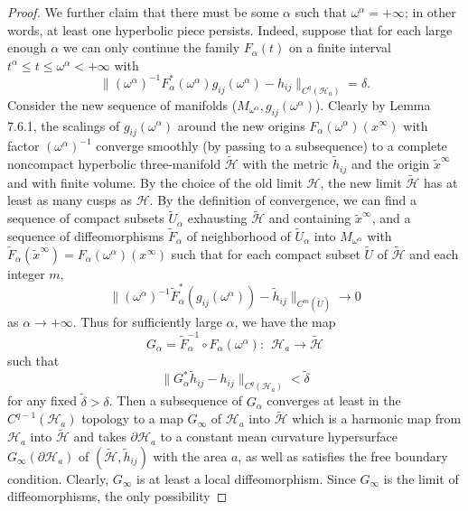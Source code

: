 \begin{proof}
We further claim that there must be some $\alpha$ such that
$\omega^{\alpha}=+\infty$; in other words, at least one hyperbolic
piece persists. Indeed, suppose that for each large enough
$\alpha$ we can only continue the family $F_{\alpha}(t)$ on a
finite interval $t^{\alpha}\leq t\leq \omega^{\alpha}<+\infty$
with
$$
\|(\omega^{\alpha})^{-1}F^*_{\alpha}(\omega^{\alpha})g_{ij}
(\omega^{\alpha})-h_{ij}\|_{C^q(\mathcal{H}_a)}=\delta.
$$
Consider the new sequence of manifolds
($M_{\omega^{\alpha}},g_{ij}(\omega^{\alpha})$). Clearly by Lemma
7.6.1, the scalings of $g_{ij}(\omega^{\alpha})$ around the new
origins $F_{\alpha}(\omega^{\alpha})(x^{\infty})$ with factor
$(\omega^{\alpha})^{-1}$ converge smoothly (by passing to a
subsequence) to a complete noncompact hyperbolic three-manifold
$\widetilde{\mathcal{H}}$ with the metric $\widetilde{h}_{ij}$ and
the origin $\widetilde{x}^{\infty}$ and with finite volume. By the
choice of the old limit $\mathcal{H}$, the new limit
$\widetilde{\mathcal{H}}$ has at least as many cusps as
$\mathcal{H}$. By the definition of convergence, we can find a
sequence of compact subsets $\widetilde{U}_{\alpha}$ exhausting
$\widetilde{\mathcal{H}}$ and containing $\widetilde{x}^{\infty}$,
and a sequence of diffeomorphisms $\widetilde{F}_{\alpha}$ of
neighborhood of $\widetilde{U}_{\alpha}$ into
$M_{\omega^{\alpha}}$ with
$\widetilde{F}_{\alpha}(\widetilde{x}^{\infty})
=F_{\alpha}(\omega^{\alpha})(x^{\infty})$ such that for each
compact subset $\widetilde{U}$ of $\widetilde{\mathcal{H}}$ and
each integer $m$,
$$
\|(\omega^{\alpha})^{-1}\widetilde{F}^*_{\alpha}(g_{ij}
(\omega^{\alpha}))-\widetilde{h}_{ij}
\|_{C^m(\widetilde{U})}\rightarrow 0
$$
as $\alpha\rightarrow+\infty$. Thus for sufficiently large
$\alpha$, we have the map
$$
G_{\alpha}=\widetilde{F}^{-1}_{\alpha}\circ
F_{\alpha}(\omega^{\alpha}):\ \ \mathcal{H}_a\rightarrow
\widetilde{\mathcal{H}}
$$
such that
$$
\|G^*_{\alpha}\widetilde{h}_{ij}-h_{ij}
\|_{C^q(\mathcal{H}_a)}<\widetilde{\delta}
$$
for any fixed $\widetilde{\delta}>\delta$. Then a subsequence of
$G_{\alpha}$ converges at least in the $C^{q-1}(\mathcal{H}_a)$
topology to a map $G_{\infty}$ of $\mathcal{H}_a$ into
$\widetilde{\mathcal{H}}$ which is a harmonic map from
$\mathcal{H}_a$ into $\widetilde{\mathcal{H}}$ and takes $\partial
\mathcal{H}_a$ to a constant mean curvature hypersurface
$G_{\infty}(\partial \mathcal{H}_a)$ of
$(\widetilde{\mathcal{H}},\widetilde{h}_{ij})$ with the area $a$,
as well as satisfies the free boundary condition. Clearly,
$G_{\infty}$ is at least a local diffeomorphism. Since
$G_{\infty}$ is the limit of diffeomorphisms, the only possibility

\end{proof}
